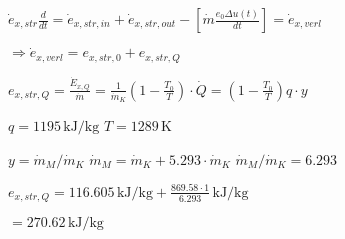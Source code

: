 \( \dot{e}_{x,str} \frac{d}{dt} = \dot{e}_{x,str,in} + \dot{e}_{x,str,out} - \left[ \dot{m} \frac{e_0 \Delta u(t)}{dt} \right] = \dot{e}_{x,verl} \)  

\( \Rightarrow \dot{e}_{x,verl} = e_{x,str,0} + e_{x,str,Q} \)  

\( e_{x,str,Q} = \frac{\dot{E}_{x,Q}}{\dot{m}} = \frac{1}{\dot{m}_K} \left( 1 - \frac{T_0}{T} \right) \cdot \dot{Q} = \left( 1 - \frac{T_0}{T} \right) q \cdot y \)  

\( q = 1195 \, \text{kJ/kg} \)  
\( T = 1289 \, \text{K} \)  

\( y = \dot{m}_M / \dot{m}_K \)  
\( \dot{m}_M = \dot{m}_K + 5.293 \cdot \dot{m}_K \)  
\( \dot{m}_M / \dot{m}_K = 6.293 \)  

\( e_{x,str,Q} = 116.605 \, \text{kJ/kg} + \frac{869.58 \cdot 1}{6.293} \, \text{kJ/kg} \)  

\( = 270.62 \, \text{kJ/kg} \)
